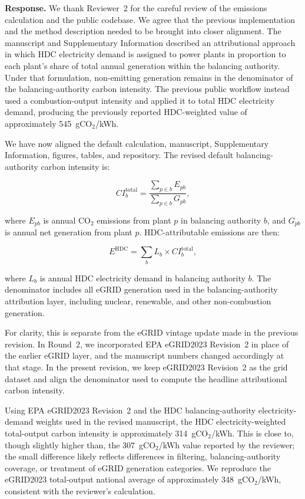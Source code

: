 \documentclass[11pt]{article}
\begin{document}
\textbf{Response.} We thank Reviewer~2 for the careful review of the emissions calculation and the public codebase. We agree that the previous implementation and the method description needed to be brought into closer alignment. The manuscript and Supplementary Information described an attributional approach in which HDC electricity demand is assigned to power plants in proportion to each plant's share of total annual generation within the balancing authority. Under that formulation, non-emitting generation remains in the denominator of the balancing-authority carbon intensity. The previous public workflow instead used a combustion-output intensity and applied it to total HDC electricity demand, producing the previously reported HDC-weighted value of approximately 545~gCO$_2$/kWh.

We have now aligned the default calculation, manuscript, Supplementary Information, figures, tables, and repository. The revised default balancing-authority carbon intensity is:

\[
CI_b^{\mathrm{total}} =
\frac{\sum_{p \in b} E_{pb}}{\sum_{p \in b} G_{pb}},
\]

where $E_{pb}$ is annual CO$_2$ emissions from plant $p$ in balancing authority $b$, and $G_{pb}$ is annual net generation from plant $p$. HDC-attributable emissions are then:

\[
E^{\mathrm{HDC}} =
\sum_b L_b \times CI_b^{\mathrm{total}},
\]

where $L_b$ is annual HDC electricity demand in balancing authority $b$. The denominator includes all eGRID generation used in the balancing-authority attribution layer, including nuclear, renewable, and other non-combustion generation.

For clarity, this is separate from the eGRID vintage update made in the previous revision. In Round~2, we incorporated EPA eGRID2023 Revision~2 in place of the earlier eGRID layer, and the manuscript numbers changed accordingly at that stage. In the present revision, we keep eGRID2023 Revision~2 as the grid dataset and align the denominator used to compute the headline attributional carbon intensity.

Using EPA eGRID2023 Revision~2 and the HDC balancing-authority electricity-demand weights used in the revised manuscript, the HDC electricity-weighted total-output carbon intensity is approximately 314~gCO$_2$/kWh. This is close to, though slightly higher than, the 307~gCO$_2$/kWh value reported by the reviewer; the small difference likely reflects differences in filtering, balancing-authority coverage, or treatment of eGRID generation categories. We reproduce the eGRID2023 total-output national average of approximately 348~gCO$_2$/kWh, consistent with the reviewer's calculation.
\end{document}
